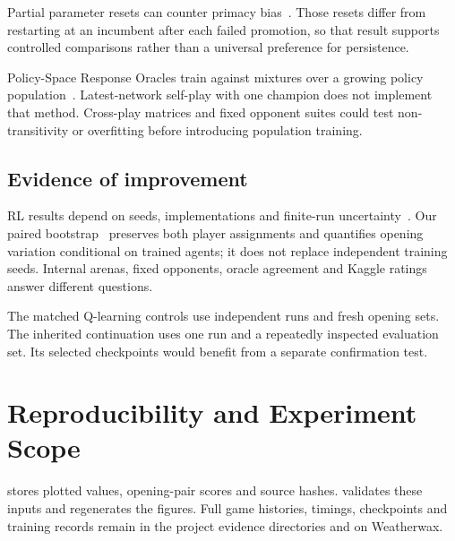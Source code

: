 \documentclass[letterpaper]{article}
\begin{document}
Partial parameter resets can counter primacy bias~\cite{nikishin2022}. Those
resets differ from restarting at an incumbent after each failed promotion, so
that result supports controlled comparisons rather than a universal preference
for persistence.

Policy-Space Response Oracles train against mixtures over a growing policy
population~\cite{lanctot2017}. Latest-network self-play with one champion does not
implement that method. Cross-play matrices and fixed opponent suites could test
non-transitivity or overfitting before introducing population training.

\subsection{Evidence of improvement}
RL results depend on seeds, implementations and finite-run
uncertainty~\cite{henderson2018,agarwal2021}. Our paired
bootstrap~\cite{efron1979} preserves both player assignments and quantifies
opening variation conditional on trained agents; it does not replace independent
training seeds. Internal arenas, fixed opponents, oracle agreement and Kaggle
ratings answer different questions.

The matched Q-learning controls use independent runs and fresh opening sets.
The inherited continuation uses one run and a repeatedly inspected evaluation
set. Its selected checkpoints would benefit from a separate confirmation test.

\clearpage
\section{Reproducibility and Experiment Scope}
\label{app:reproducibility}
 stores plotted values, opening-pair scores and
source hashes.  validates these inputs and regenerates the
figures. Full game histories, timings, checkpoints and training records remain
in the project evidence directories and on Weatherwax.
\end{document}
